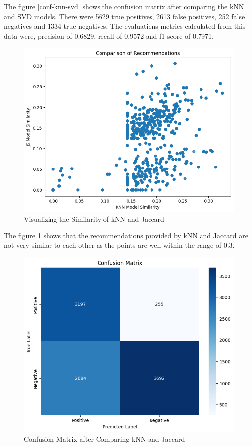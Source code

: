     \newpage

The figure \ref{conf-knn-svd} shows the confusion matrix after comparing the kNN and SVD models. There were 5629 true positives, 2613 false positives, 252 false negatives and 1334 true negatives. The evaluations metrics calculated from this data were, precision of 0.6829, recall of 0.9572 and f1-score of 0.7971.

\begin{figure}[h]
        \centering
        \includegraphics[width=1\linewidth]{img/Graphics/sim-knn-js.png}
        \caption{Visualizing the Similarity of kNN and Jaccard}
        \label{sim-knn-js}
    \end{figure}

    \newpage

The figure \ref{sim-knn-js} shows that the recommendations provided by kNN and Jaccard are not very similar to each other as the points are well within the range of 0.3.


\begin{figure}[h]
        \centering
        \includegraphics[width=1\linewidth]{img/Graphics/conf-knn-js.png}
        \caption{Confusion Matrix after Comparing kNN and Jaccard}
        \label{conf-knn-js}
    \end{figure}

